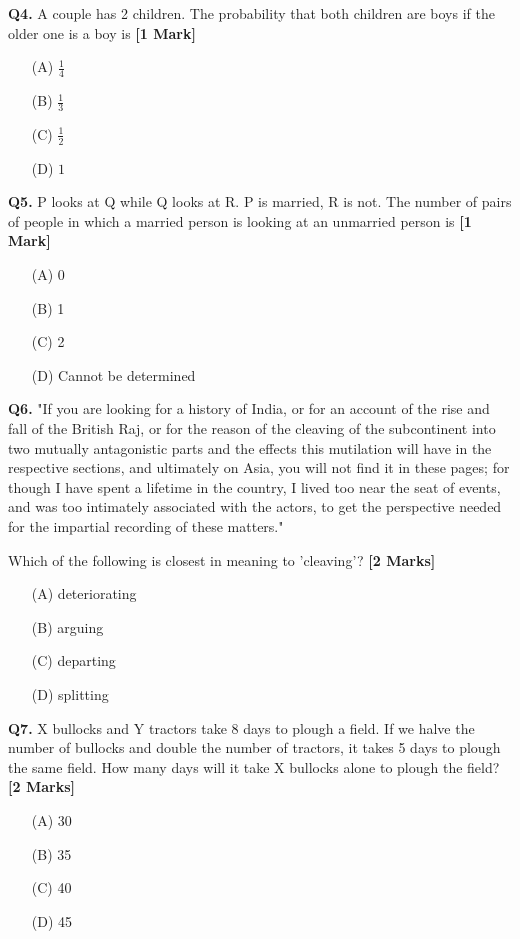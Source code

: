 \documentclass[11pt]{article}
\newcommand{\questiona}[2]{
    \noindent\textbf{Q#2.} #1 \hfill \textbf{[1 Mark]}
}
\newcommand{\questionb}[2]{
    \noindent\textbf{Q#2.} #1 \hfill \textbf{[2 Marks]}
}
\begin{document}
\questiona{A couple has 2 children. The probability that both children are boys if the older one is a boy is}{4}
\begin{enumerate}
    \item[(A)] $\frac{1}{4}$
    \item[(B)] $\frac{1}{3}$  
    \item[(C)] $\frac{1}{2}$
    \item[(D)] $1$
\end{enumerate}

\vspace{0.5cm}

\questiona{P looks at Q while Q looks at R. P is married, R is not. The number of pairs of people in which a married person is looking at an unmarried person is}{5}
\begin{enumerate}
    \item[(A)] 0
    \item[(B)] 1  
    \item[(C)] 2
    \item[(D)] Cannot be determined
\end{enumerate}

\vspace{0.5cm}

\questionb{"If you are looking for a history of India, or for an account of the rise and fall of the British Raj, or for the reason of the cleaving of the subcontinent into two mutually antagonistic parts and the effects this mutilation will have in the respective sections, and ultimately on Asia, you will not find it in these pages; for though I have spent a lifetime in the country, I lived too near the seat of events, and was too intimately associated with the actors, to get the perspective needed for the impartial recording of these matters."

Which of the following is closest in meaning to 'cleaving'?}{6}
\begin{enumerate}
    \item[(A)] deteriorating
    \item[(B)] arguing  
    \item[(C)] departing
    \item[(D)] splitting
\end{enumerate}

\vspace{0.5cm}

\questionb{X bullocks and Y tractors take 8 days to plough a field. If we halve the number of bullocks and double the number of tractors, it takes 5 days to plough the same field. How many days will it take X bullocks alone to plough the field?}{7}
\begin{enumerate}
    \item[(A)] 30
    \item[(B)] 35  
    \item[(C)] 40
    \item[(D)] 45
\end{enumerate}
\end{document}
